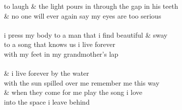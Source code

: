 \begin{Parallel}{0.48\textwidth}{0.48\textwidth}
{to laugh \& the light pours in \indent through the gap in his teeth\\
\& no one will ever again say my eyes are too serious\\
\-\ \\ i press my body to a man that i find beautiful \indent \& sway\\
to a song that knows us \indent \indent i live forever\\
with my feet in my grandmother’s lap\\
\-\ \\\& \indent \indent  \indent \indent i live forever by the water\\
with the sun spilled over me \indent remember me this way\\
\& when they come for me \indent \indent play the song i love\\
into the space i leave behind}
\ParallelPar
\end{Parallel}
\vfill
\hspace{0pt}